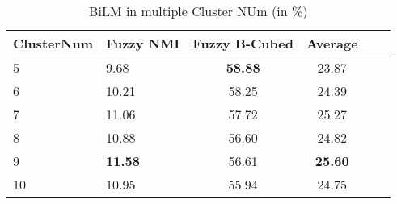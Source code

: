 \begin{table}[htbp!] %
    \centering
    \begin{tabular}{llcccc}
    \midrule
        ClusterNum   & Fuzzy NMI     & Fuzzy B-Cubed  & Average  \\
    \midrule
    5          &9.68         & \bf{58.88}  & 23.87      \\
    6          &10.21        & 58.25       & 24.39      \\
    7          &11.06        & 57.72       & 25.27      \\
    8          &10.88        & 56.60       & 24.82      \\
    9          &\bf{11.58}   & 56.61       & \bf{25.60} \\
    10         &10.95        & 55.94       & 24.75      \\
    \bottomrule
    \end{tabular}
\caption{BiLM in multiple Cluster NUm (in \%)}
\label{tab:embedding}
\end{table}
